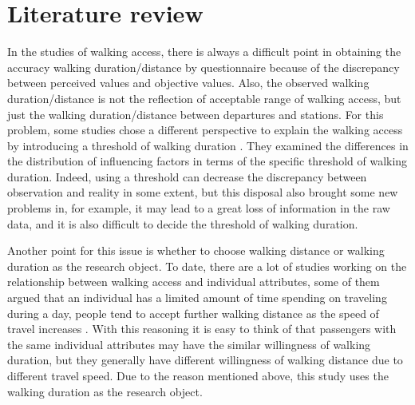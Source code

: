 %
\section{Literature review}

In the studies of walking access, there is always a difficult point in obtaining the accuracy walking duration/distance by questionnaire because of the discrepancy between perceived values and objective values. Also, the observed walking duration/distance is not the reflection of acceptable range of walking access, but just the walking duration/distance between departures and stations. For this problem, some studies chose a different perspective to explain the walking access by introducing a threshold of walking duration \cite{besser2005walking,mccormack2008objective}. They examined the differences in the distribution of influencing factors in terms of the specific threshold of walking duration. Indeed, using a threshold can decrease the discrepancy between observation and reality in some extent, but this disposal also brought some new problems in, for example, it may lead to a great loss of information in the raw data, and it is also difficult to decide the threshold of walking duration.

%
Another point for this issue is whether to choose walking distance or walking duration as the research object. To date, there are a lot of studies working on the relationship between walking access and individual attributes, some of them argued that an individual has a limited amount of time spending on traveling during a day, people tend to accept further walking distance as the speed of travel increases \cite{marchetti1994anthropological,larsen2010beyond}. With this reasoning it is easy to think of that passengers with the same individual attributes may have the similar willingness of walking duration, but they generally have different willingness of walking distance due to different travel speed. Due to the reason mentioned above, this study uses the walking duration as the research object.

